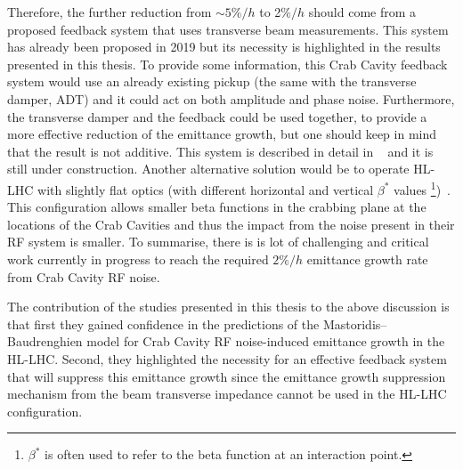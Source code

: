 Therefore, the further reduction from $\sim 5\%/h$ to 2$\%/h$ should come from a proposed feedback system that uses transverse beam measurements. This system has already been proposed in 2019 but its necessity is highlighted in the results presented in this thesis. To provide some information, this Crab Cavity feedback system would use an already existing pickup (the same with the transverse damper, ADT) and it could act on both amplitude and phase noise.  Furthermore, the transverse damper and the feedback could be used together, to provide a more effective reduction of the emittance growth, but one should keep in mind that the result is not additive. This system is described in detail in ~\cite{Baudrenghien:2665950} and it is still under construction. %
Another alternative solution would be to operate HL-LHC with slightly flat optics (with different horizontal and vertical $\beta^{\ast}$ values \footnote{$\beta^{\ast}$ is often used to refer to the beta function at an interaction point.})~\cite{elias_run4_op}. %
This configuration allows smaller beta functions in the crabbing plane at the locations of the Crab Cavities and thus the impact from the noise present in their RF system is smaller. To summarise, there is is lot of challenging and critical work currently in progress to reach the required $2\%/h$ emittance growth rate from Crab Cavity RF noise.


The contribution of the studies presented in this thesis to the above discussion is that first they gained confidence in the predictions of the Mastoridis--Baudrenghien model for Crab Cavity RF noise-induced emittance growth in the HL-LHC. Second, they highlighted the necessity for an effective feedback system that will suppress this emittance growth since the emittance growth suppression mechanism from the beam transverse impedance cannot be used in the HL-LHC configuration. 



